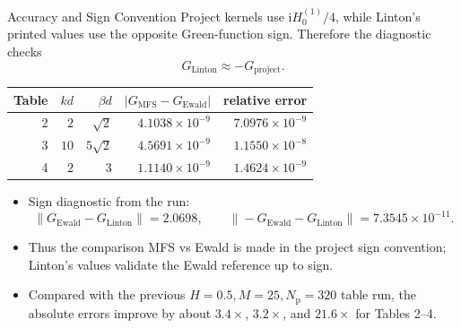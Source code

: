 \documentclass[aspectratio=169]{beamer}
\newcommand{\ii}{\mathrm{i}}
\begin{document}
\begin{frame}{Accuracy and Sign Convention}
  \scriptsize
  Project kernels use \(\ii H_0^{(1)}/4\), while Linton's printed values use
  the opposite Green-function sign.  Therefore the diagnostic checks
  \[
    G_{\mathrm{Linton}}\approx -G_{\mathrm{project}}.
  \]

  \vspace{0.25em}
  \begin{center}
  \renewcommand{\arraystretch}{1.12}
  \begin{tabular}{rrrrr}
    \hline
    Table & \(kd\) & \(\beta d\) & \(|G_{\mathrm{MFS}}-G_{\mathrm{Ewald}}|\)
      & relative error\\
    \hline
    2 & \(2\) & \(\sqrt2\) & \(4.1038{\times}10^{-9}\) & \(7.0976{\times}10^{-9}\)\\
    3 & \(10\) & \(5\sqrt2\) & \(4.5691{\times}10^{-9}\) & \(1.1550{\times}10^{-8}\)\\
    4 & \(2\) & \(3\) & \(1.1140{\times}10^{-9}\) & \(1.4624{\times}10^{-9}\)\\
    \hline
  \end{tabular}
  \end{center}

  \vspace{0.35em}
  \begin{itemize}
    \item Sign diagnostic from the run:
    \[
      \|G_{\mathrm{Ewald}}-G_{\mathrm{Linton}}\|=2.0698,
      \qquad
      \|-G_{\mathrm{Ewald}}-G_{\mathrm{Linton}}\|=7.3545{\times}10^{-11}.
    \]
    \item Thus the comparison MFS vs Ewald is made in the project sign
    convention; Linton's values validate the Ewald reference up to sign.
    \item Compared with the previous \(H=0.5,M=25,N_{\mathrm p}=320\)
    table run, the absolute errors improve by about \(3.4\times\),
    \(3.2\times\), and \(21.6\times\) for Tables 2--4.
  \end{itemize}
\end{frame}
\end{document}
